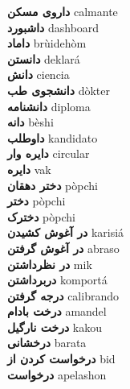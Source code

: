 \textbf{ داروی مسکن  } calmante \\
\textbf{ داشبورد  } dashboard \\
\textbf{ داماد  } brùidehòm \\
\textbf{ دانستن  } deklará \\
\textbf{ دانش  } ciencia \\
\textbf{ دانشجوی طب  } dòkter \\
\textbf{ دانشنامه  } diploma \\
\textbf{ دانه  } bèshi \\
\textbf{ داوطلب  } kandidato \\
\textbf{ دایره وار  } circular \\
\textbf{ دایره  } vak \\
\textbf{ دختر دهقان  } pòpchi \\
\textbf{ دختر  } pòpchi \\
\textbf{ دخترک  } pòpchi \\
\textbf{ در آغوش کشیدن  } karisiá \\
\textbf{ در آغوش گرفتن  } abraso \\
\textbf{ در نظرداشتن  } mik \\
\textbf{ دربرداشتن  } komportá \\
\textbf{ درجه گرفتن  } calibrando \\
\textbf{ درخت بادام  } amandel \\
\textbf{ درخت نارگیل  } kakou \\
\textbf{ درخشانی  } barata \\
\textbf{ درخواست کردن از  } bid \\
\textbf{ درخواست  } apelashon \\
